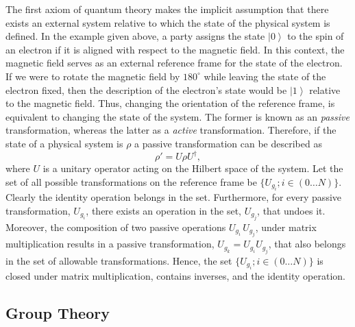 \documentclass{article}
\newcommand{\ket}[1]{\left|#1\right\rangle}
\newcommand\defn[1]{\textsl{#1}}
\begin{document}
The first axiom of quantum theory makes the implicit assumption that there
exists an external system relative to which the state of the physical system is
defined.  In the example given above, a party assigns the state $\ket{0}$ to the spin of
an electron if it is aligned with respect to the magnetic field.  In this context, the
magnetic field serves as an external reference frame for the state of the electron.  If we were
to rotate the magnetic field by $180^{\circ}$ while leaving the state of the electron fixed, then
the description of the  electron's state would be $\ket{1}$ relative to the magnetic field.  Thus,
changing the orientation of the reference frame, is equivalent to changing the state of the system.  The former is known as an \defn{passive} transformation, whereas the latter
as a \defn{active} transformation. Therefore, if the state of a physical system is $\rho$ a passive transformation can be described as 
\begin{equation}
 \rho'=U\rho U^{\dagger},
\label{27}
\end{equation}
where $U$ is a unitary operator acting on the Hilbert space of the system. Let the set of all possible transformations on the  reference frame be $\{U_{g_i}; i\in(0\ldots N)\}$.  Clearly the identity operation belongs in the set. Furthermore, for every passive transformation,
$U_{g_i}$, there exists an operation in the set, $U_{g_j}$, that undoes it. 
Moreover, the composition of two passive operations 
$U_{g_i}\, U_{g_j}$, under matrix multiplication results in a passive transformation,
$U_{g_k}=U_{g_i}U_{g_j}$, that also belongs in the set of 
allowable transformations. Hence, the set $\{U_{g_i}; i\in(0\ldots N)\}$ is closed under matrix
multiplication, contains inverses, and the identity operation. 

\subsection{Group Theory}
\end{document}

